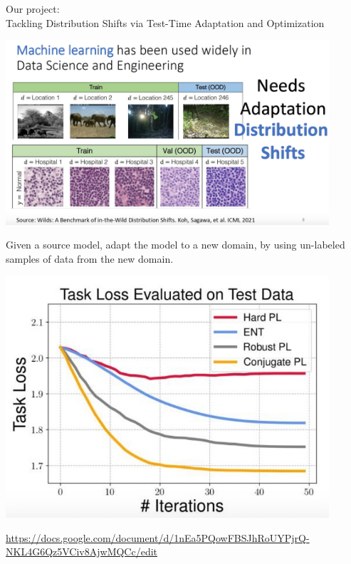 \documentclass{beamer}
\begin{document}
\begin{frame}{}

\end{frame}

\begin{frame}{}

\end{frame}

\begin{frame}

\begin{block}{}
Our project: \\ Tackling Distribution Shifts via Test-Time Adaptation and Optimization
\end{block}

\end{frame}

\begin{frame}
{
\centering
 \includegraphics[width=12cm]{fig1.jpg}
}


\end{frame}

\begin{frame}[t]
\large 
\begin{exampleblock}{}
Given a source model, adapt the model to a new domain, by using un-labeled samples of data from the new domain.
\end{exampleblock}

\end{frame}

\begin{frame}[t]

{
\centering
 \includegraphics[width=12cm]{fig3.jpg}
}

\end{frame}

\begin{frame}[t]
{}

\url{https://docs.google.com/document/d/1nEa5PQowFBSJhRoUYPjrQ-NKL4G6Qz5VCiv8AjwMQCc/edit}

\end{frame}
\end{document}
